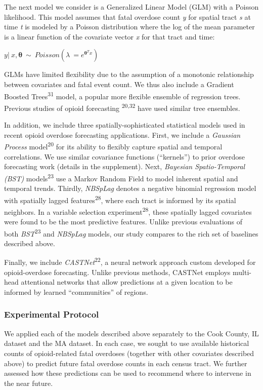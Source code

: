 The next model we consider is a Generalized Linear Model (GLM) with a Poisson likelihood. This model assumes that fatal overdose count \emph{y} for spatial tract \emph{s} at time \emph{t} is modeled by a Poisson distribution where the log of the mean parameter is a linear function of the covariate vector \emph{x} for that tract and time:

\(y|\ x,{\mathbf{θ}}\  \sim \ Poisson(\lambda\  = e^{{\mathbf{θ}}^{T}x})\ \)

GLMs have limited flexibility due to the assumption of a monotonic relationship between covariates and fatal event count. We thus also include a Gradient Boosted Trees\textsuperscript{31} model, a popular more flexible ensemble of regression trees. Previous studies of opioid forecasting \textsuperscript{20,32} have used similar tree ensembles.

In addition, we include three spatially-sophisticated statistical models used in recent opioid overdose forecasting applications. First, we include a \emph{Gaussian Process} model\textsuperscript{20} for its ability to flexibly capture spatial and temporal correlations. We use similar covariance functions (``kernels'') to prior overdose forecasting work (details in the supplement). Next, \emph{Bayesian Spatio-Temporal (BST)} models\textsuperscript{23} use a Markov Random Field to model inherent spatial and temporal trends. Thirdly, \emph{NBSpLag} denotes a negative binomial regression model with spatially lagged features\textsuperscript{28}, where each tract is informed by its spatial neighbors. In a variable selection experiment\textsuperscript{28}, these spatially lagged covariates were found to be the most predictive features. Unlike previous evaluations of both \emph{BST}\textsuperscript{23} and \emph{NBSpLag} models, our study compares to the rich set of baselines described above.

Finally, we include \emph{CASTNet}\textsuperscript{22}, a neural network approach custom developed for opioid-overdose forecasting. Unlike previous methods, CASTNet employs multi-head attentional networks that allow predictions at a given location to be informed by learned ``communities'' of regions.

\subsubsection{Experimental Protocol}\label{experimental-protocol}

We applied each of the models described above separately to the Cook County, IL dataset and the MA dataset. In each case, we sought to use available historical counts of opioid-related fatal overdoses (together with other covariates described above) to predict future fatal overdose counts in each census tract. We further assessed how these predictions can be used to recommend where to intervene in the near future.

